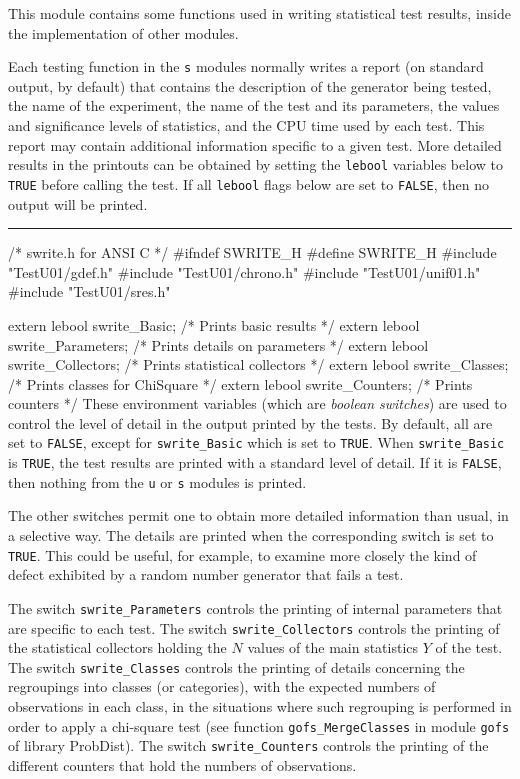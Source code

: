 
This module contains some functions used in writing statistical 
test results, inside the implementation of other modules.

Each testing function in the {\tt s} modules normally
writes a report (on standard output, by default) 
that contains the description of the generator being tested,
the name of the experiment, the name of the test and its parameters,
the values and significance levels of statistics,
and the CPU time used by each test.
This report may contain additional information specific to a given test.
More detailed results in the printouts can be obtained by setting 
the {\tt lebool} variables below to {\tt TRUE} before
calling the test. If all {\tt lebool} flags below are set to {\tt FALSE}, then
no output will be printed.


\bigskip\hrule
\code\hide
/* swrite.h for ANSI C */
#ifndef SWRITE_H
#define SWRITE_H
\endhide
#include "TestU01/gdef.h"
#include "TestU01/chrono.h"
#include "TestU01/unif01.h"
#include "TestU01/sres.h"
\endcode



\code

extern lebool swrite_Basic;           /* Prints basic results           */
extern lebool swrite_Parameters;      /* Prints details on parameters   */
extern lebool swrite_Collectors;      /* Prints statistical collectors  */
extern lebool swrite_Classes;         /* Prints classes for ChiSquare   */
extern lebool swrite_Counters;        /* Prints counters                */
\endcode
 \tab These environment variables (which are {\em boolean switches\/}) are used to 
  control the level of detail in the output printed by the tests. 
  By default, all are set to {\tt FALSE}, except for
  {\tt swrite\_Basic} which is set to {\tt TRUE}.
  When {\tt swrite\_Basic} is {\tt TRUE}, the test results are printed
  with a standard level of detail. 
  If it is {\tt FALSE}, then nothing from the  {\tt u} or  {\tt s}
  modules is printed.

  The other switches permit one to obtain more detailed information than 
  usual, in a selective way.  The details are printed when the 
  corresponding switch is set to {\tt TRUE}.
  This could be useful, for example, to examine more closely the kind of
  defect exhibited by a random number generator that fails a test.
  
  The switch {\tt swrite\_Parameters}  controls the printing of
  internal parameters that are specific to each test.
  The switch {\tt swrite\_Collectors} controls the printing of the 
  statistical collectors holding the $N$ values of the main statistics 
  $Y$ of the test.
  The switch {\tt swrite\_Classes} controls the printing of details 
  concerning the regroupings into classes (or categories),
  with the expected numbers of observations in each class,
  in the situations where such regrouping is performed in order 
  to apply a  chi-square test (see function  {\tt gofs\_MergeClasses}
  in module {\tt gofs} of library ProbDist).
  The switch {\tt swrite\_Counters} controls the printing of the different
  counters that hold the numbers of observations.
 \endtab
\code


